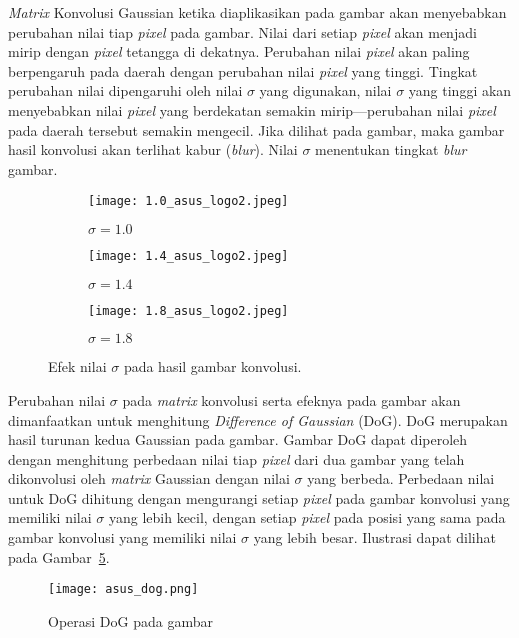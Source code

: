 \textit{Matrix} Konvolusi Gaussian ketika diaplikasikan pada gambar akan menyebabkan perubahan nilai tiap \textit{pixel} pada gambar. Nilai dari setiap \textit{pixel} akan menjadi mirip dengan \textit{pixel} tetangga di dekatnya. Perubahan nilai \textit{pixel} akan paling berpengaruh pada daerah dengan perubahan nilai \textit{pixel} yang tinggi. Tingkat perubahan nilai dipengaruhi oleh nilai $\sigma$ yang digunakan, nilai $\sigma$ yang tinggi akan menyebabkan nilai \textit{pixel} yang berdekatan semakin mirip---perubahan nilai \textit{pixel} pada daerah tersebut semakin mengecil. Jika dilihat pada gambar, maka gambar hasil konvolusi akan terlihat kabur (\textit{blur}). Nilai $\sigma$ menentukan tingkat \textit{blur} gambar.

\begin{figure}[H]
	\centering
	\begin{subfigure}[b]{.33\textwidth}
		\centering
		\texttt{[image: 1.0\_asus\_logo2.jpeg]}
		\caption{$\sigma=1.0$}
		\label{subfig:asus_sigma1.0}
	\end{subfigure}%
	\begin{subfigure}[b]{.33\textwidth}
		\centering
		\texttt{[image: 1.4\_asus\_logo2.jpeg]}
		\caption{$\sigma=1.4$}
		\label{subfig:asus_sigma1.4}
	\end{subfigure}
	\begin{subfigure}[b]{.33\textwidth}
		\centering
		\texttt{[image: 1.8\_asus\_logo2.jpeg]}
		\caption{$\sigma=1.8$}
		\label{subfig:asus_sigma1.8}
	\end{subfigure}
	\caption{Efek nilai $\sigma$ pada hasil gambar konvolusi.}
	\label{fig:asus_konv}
\end{figure}

Perubahan nilai $\sigma$ pada \textit{matrix} konvolusi serta efeknya pada gambar akan dimanfaatkan untuk menghitung \textit{Difference of Gaussian} (DoG). DoG merupakan hasil turunan kedua Gaussian pada gambar. Gambar DoG dapat diperoleh dengan menghitung perbedaan nilai tiap \textit{pixel} dari dua gambar yang telah dikonvolusi oleh \textit{matrix} Gaussian dengan nilai $\sigma$ yang berbeda. Perbedaan nilai untuk DoG dihitung dengan mengurangi setiap \textit{pixel} pada gambar konvolusi yang memiliki nilai $\sigma$ yang lebih kecil, dengan setiap \textit{pixel} pada posisi yang sama pada gambar konvolusi yang memiliki nilai $\sigma$ yang lebih besar. Ilustrasi dapat dilihat pada Gambar~\ref{fig:dog_asus}. 
\begin{figure}[H]
	\centering
	\texttt{[image: asus\_dog.png]}
	\caption{Operasi DoG pada gambar}
	\label{fig:dog_asus}
\end{figure} 

